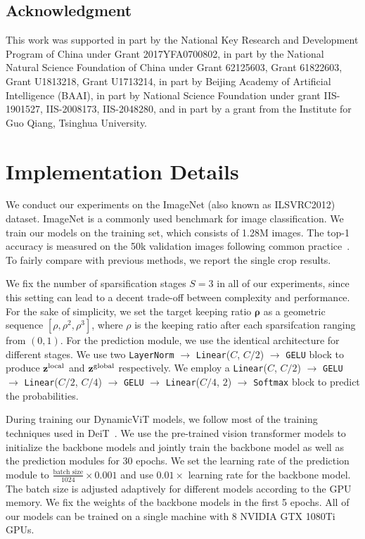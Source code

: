 \documentclass{article}
\begin{document}
\subsection*{Acknowledgment}

This work was supported in part by the National Key Research and Development Program of China under Grant 2017YFA0700802, in part by the National Natural Science Foundation of China under Grant 62125603, Grant 61822603, Grant U1813218, Grant U1713214, in part by Beijing Academy of Artificial Intelligence (BAAI), in part by National Science Foundation  under grant IIS-1901527, IIS-2008173, IIS-2048280, 
and in part by a grant from the Institute for Guo Qiang, Tsinghua University.




\appendix

\section{Implementation Details}\label{sec:details}

We conduct our experiments on the ImageNet (also known as ILSVRC2012)~\cite{deng2009imagenet} dataset. ImageNet is a commonly used benchmark for image classification. We train our models on the training set, which consists of 1.28M images. The top-1 accuracy is measured on the 50k validation images following common practice~\cite{he2016deep,touvron2020deit}. To fairly compare with previous methods, we report the single crop results. 

We fix the number of sparsification stages $S=3$ in all of our experiments, since this setting can lead to a decent trade-off between complexity and performance. For the sake of simplicity, we set the target keeping ratio $\bm{\rho}$ as a geometric sequence $[\rho, \rho^2, \rho^3]$, where $\rho$ is the keeping ratio after each sparsifcation ranging from $(0, 1)$. For the prediction module, we use the identical architecture for different stages. We  use two \texttt{LayerNorm} $\to$ \texttt{Linear}($C$, $C/2$) $\to$ \texttt{GELU} block to produce $\mathbf{z}^{\rm local}$ and $ \mathbf{z}^{\rm global}$  respectively. We employ a \texttt{Linear}($C$, $C/2$) $\to$ \texttt{GELU} $\to$ \texttt{Linear}($C/2$, $C/4$) $\to$ \texttt{GELU} $\to$ \texttt{Linear}($C/4$, $2$) $\to$ \texttt{Softmax} block to predict the probabilities.

During training our DynamicViT models, we follow most of the training techniques used in DeiT~\cite{touvron2020deit}. We use the pre-trained vision transformer models to initialize the backbone models and jointly train the backbone model as well as the prediction modules for 30 epochs. We set the learning rate of the prediction module to $\frac{\text{batch size}}{1024}\times 0.001$ and use $0.01\times$  learning rate for the backbone model. The batch size is adjusted adaptively for different models according to the GPU memory.  We fix the weights of the backbone models in the first 5 epochs. All of our models can be trained on a single machine with 8 NVIDIA GTX 1080Ti GPUs.
\end{document}
